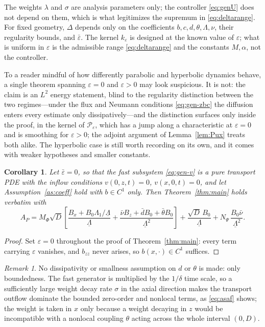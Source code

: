 \documentclass[12pt]{article}
\theoremstyle{plain}
\newtheorem{corollary}{Corollary}
\theoremstyle{remark}
\newtheorem{remark}{Remark}
\newcommand{\uL}{\underline\Lambda}
\newcommand{\PP}{\mathcal P}
\begin{document}
The weights $\lambda$ and $\sigma$ are analysis parameters only; the controller \eqref{eq:genU} does not depend on them, which is what legitimizes the supremum in \eqref{eq:deltarange}. For fixed geometry, $\Delta$ depends only on the coefficients $b,c,d,\theta,\Lambda,\nu$, their regularity bounds, and $\bar\varepsilon$. The kernel $k_\varepsilon$ is designed at the known value of $\varepsilon$; what is uniform in $\varepsilon$ is the admissible range \eqref{eq:deltarange} and the constants $M,\alpha$, not the controller.

To a reader mindful of how differently parabolic and hyperbolic dynamics behave, a single theorem spanning $\varepsilon=0$ and $\varepsilon>0$ may look suspicious. It is not: the claim is an $L^2$ energy statement, blind to the regularity distinction between the two regimes---under the flux and Neumann conditions \eqref{eq:gen-zbc} the diffusion enters every estimate only dissipatively---and the distinction surfaces only inside the proof, in the kernel of $\PP_\varepsilon$, which has a jump along a characteristic at $\varepsilon=0$ and is smoothing for $\varepsilon>0$; the adjoint argument of Lemma~\ref{lem:Pux} treats both alike. The hyperbolic case is still worth recording on its own, and it comes with weaker hypotheses and smaller constants.

\begin{corollary}\label{cor:transport}
Let $\bar\varepsilon=0$, so that the fast subsystem \eqref{eq:gen-v} is a pure transport PDE with the inflow conditions $v(0,z,t)=0$, $v(x,0,t)=0$, and let Assumption~\ref{as:coeff} hold with $b\in C^1$ only. Then Theorem~\ref{thm:main} holds verbatim with
\begin{equation}
 A_P=M_\Phi\sqrt D\left[
 \frac{B_x+B_0\Lambda_1/\uL}{\uL}
 +\frac{\bar\nu B_z+\bar dB_0+\bar\theta B_0}{\uL^2}
 \right]
 +\frac{\sqrt D\,B_0}{\uL}
 +N_\Psi\,\frac{B_0\bar\nu}{\uL^2} .
 \label{eq:APtransport}
\end{equation}
\end{corollary}

\begin{proof}
Set $\varepsilon=0$ throughout the proof of Theorem~\ref{thm:main}: every term carrying $\varepsilon$ vanishes, and $b_{zz}$ never arises, so $b(x,\cdot)\in C^1$ suffices.
\end{proof}

\begin{remark}
No dissipativity or smallness assumption on $d$ or $\theta$ is made: only boundedness. The fast generator is multiplied by the $1/\delta$ time scale, so a sufficiently large weight decay rate $\sigma$ in the axial direction makes the transport outflow dominate the bounded zero-order and nonlocal terms, as \eqref{eq:asaf} shows; the weight is taken in $x$ only because a weight decaying in $z$ would be incompatible with a nonlocal coupling $\theta$ acting across the whole interval $(0,D)$.
\end{remark}
\end{document}
